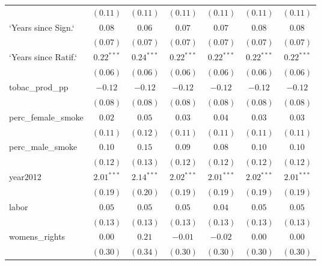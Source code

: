 \begin{table}[!h]
\begin{center}
\begin{tabular}{l c c c c c c }
                        & $(0.11)$     & $(0.11)$     & $(0.11)$     & $(0.11)$     & $(0.11)$     & $(0.11)$     \\
`Years since Sign.`     & $0.08$       & $0.06$       & $0.07$       & $0.07$       & $0.08$       & $0.08$       \\
                        & $(0.07)$     & $(0.07)$     & $(0.07)$     & $(0.07)$     & $(0.07)$     & $(0.07)$     \\
`Years since Ratif.`    & $0.22^{***}$ & $0.24^{***}$ & $0.22^{***}$ & $0.22^{***}$ & $0.22^{***}$ & $0.22^{***}$ \\
                        & $(0.06)$     & $(0.06)$     & $(0.06)$     & $(0.06)$     & $(0.06)$     & $(0.06)$     \\
tobac\_prod\_pp         & $-0.12$      & $-0.12$      & $-0.12$      & $-0.12$      & $-0.12$      & $-0.12$      \\
                        & $(0.08)$     & $(0.08)$     & $(0.08)$     & $(0.08)$     & $(0.08)$     & $(0.08)$     \\
perc\_female\_smoke     & $0.02$       & $0.05$       & $0.03$       & $0.04$       & $0.03$       & $0.03$       \\
                        & $(0.11)$     & $(0.12)$     & $(0.11)$     & $(0.11)$     & $(0.11)$     & $(0.11)$     \\
perc\_male\_smoke       & $0.10$       & $0.15$       & $0.09$       & $0.08$       & $0.10$       & $0.10$       \\
                        & $(0.12)$     & $(0.13)$     & $(0.12)$     & $(0.12)$     & $(0.12)$     & $(0.12)$     \\
year2012                & $2.01^{***}$ & $2.14^{***}$ & $2.02^{***}$ & $2.01^{***}$ & $2.02^{***}$ & $2.01^{***}$ \\
                        & $(0.19)$     & $(0.20)$     & $(0.19)$     & $(0.19)$     & $(0.19)$     & $(0.19)$     \\
labor                   & $0.05$       & $0.05$       & $0.05$       & $0.04$       & $0.05$       & $0.05$       \\
                        & $(0.13)$     & $(0.13)$     & $(0.13)$     & $(0.13)$     & $(0.13)$     & $(0.13)$     \\
womens\_rights          & $0.00$       & $0.21$       & $-0.01$      & $-0.02$      & $0.00$       & $0.00$       \\
                        & $(0.30)$     & $(0.34)$     & $(0.30)$     & $(0.30)$     & $(0.30)$     & $(0.30)$     \\

\end{tabular}
\end{center}
\end{table}
